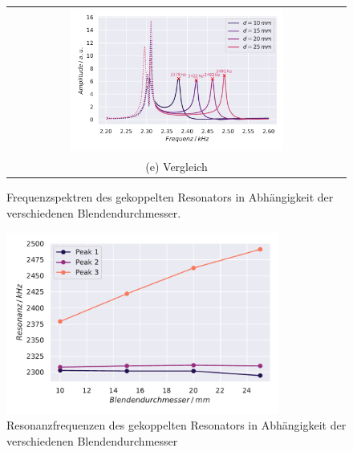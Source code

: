 \begin{figure}[H]
\begin{tabular}{cc}
  \multicolumn{2}{c}{\includegraphics[width=0.65\textwidth]{Daten/Wasserstoffmolekuelion/neu/blendAbhaeng.pdf}}\\[6pt]
  \multicolumn{2}{c}{(e) Vergleich}
  \end{tabular}
  \caption{Frequenzspektren des gekoppelten Resonators in Abhängigkeit der verschiedenen Blendendurchmesser.} 
  \label{fig:h2}
\end{figure}
\begin{figure}[H]
  \centering
  \includegraphics[width=0.8\textwidth]{Daten/Wasserstoffmolekuelion/neu/resonanzBlend.pdf}
  \caption{Resonanzfrequenzen des gekoppelten Resonators in Abhängigkeit der verschiedenen Blendendurchmesser}
  \label{fig:h2Res}
\end{figure}

